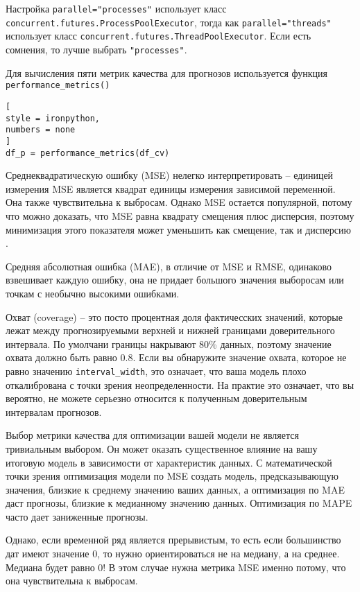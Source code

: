 \documentclass[%
	11pt,
	a4paper,
	utf8,
		]{article}
\begin{document}
Настройка \verb|parallel="processes"| использует класс \verb|concurrent.futures.ProcessPoolExecutor|, тогда как \verb|parallel="threads"| использует класс \verb|concurrent.futures.ThreadPoolExecutor|. Если есть сомнения, то лучше выбрать \verb|"processes"|.

Для вычисления пяти метрик качества для прогнозов используется функция \verb|performance_metrics()|
\begin{lstlisting}[
style = ironpython,
numbers = none
]
df_p = performance_metrics(df_cv)
\end{lstlisting}

Среднеквадратическую ошибку (MSE) нелегко интерпретировать -- единицей измерения MSE является квадрат единицы измерения зависимой переменной. Она также чувствительна к выбросам. Однако MSE остается популярной, потому что можно доказать, что MSE равна квадрату смещения плюс дисперсия, поэтому минимизация этого показателя может уменьшить как смещение, так и дисперсию \cite[]{gruzdev:time-series-2022}.

Средняя абсолютная ошибка (MAE), в отличие от MSE и RMSE, одинаково взвешивает каждую ошибку, она не придает большого значения выборосам или точкам с необычно высокими ошибками.

Охват (coverage) -- это посто процентная доля фактичесских значений, которые лежат между прогнозируемыми верхней и нижней границами доверительного интервала. По умолчани границы накрывают 80\% данных, поэтому значение охвата должно быть равно 0.8. Если вы обнаружите значение охвата, которое не равно значению \verb|interval_width|, это означает, что ваша модель плохо откалибрована с точки зрения неопределенности. На практие это означает, что вы вероятно, не можете серьезно относится к полученным доверительным интервалам прогнозов.

Выбор метрики качества для оптимизации вашей модели не является тривиальным выбором. Он может оказать существенное влияние на вашу итоговую модель в зависимости от характеристик данных. С математической точки зрения оптимизация модели по MSE создать модель, предсказывающую значения, близкие к среднему значению ваших данных, а оптимизация по MAE даст прогнозы, близкие к медианному значению данных. Оптимизация по MAPE часто дает заниженные прогнозы.

Однако, если временной ряд является прерывистым, то есть если большинство дат имеют значение 0, то нужно ориентироваться не на медиану, а на среднее. Медиана будет равно 0! В этом случае нужна метрика MSE именно потому, что она чувствительна к выбросам.
\end{document}
